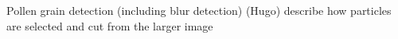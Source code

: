 Pollen grain detection (including blur detection) (Hugo)
describe how particles are selected and cut from the larger image